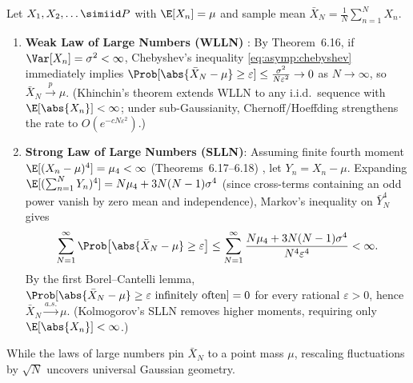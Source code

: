 \documentclass[../../../../master.tex]{subfiles}
\begin{document}
\begin{coremath}
Let $X_1, X_2, \dots \simiid P$ with $\E[X_n] = \mu$ and sample mean $\bar{X}_N = \frac{1}{N}\sum_{n=1}^N X_n$.
\begin{enumerate}
  \item \textbf{Weak Law of Large Numbers (WLLN)} : By Theorem~6.16, if $\Var[X_n] = \sigma^2 < \infty$, Chebyshev's inequality \eqref{eq:asymp:chebyshev} immediately implies $\Prob[\abs{\bar{X}_N - \mu} \ge \varepsilon] \le \frac{\sigma^2}{N\varepsilon^2} \to 0$ as $N \to \infty$, so $\bar{X}_N \xrightarrow{p} \mu$. (Khinchin's theorem extends WLLN to any i.i.d.\ sequence with $\E[\abs{X_n}] < \infty$; under sub-Gaussianity, Chernoff/Hoeffding strengthens the rate to $O(e^{-cN\varepsilon^2})$.)
  \item \textbf{Strong Law of Large Numbers (SLLN)}: Assuming finite fourth moment $\E[(X_n - \mu)^4] = \mu_4 < \infty$ (Theorems~6.17--6.18) , let $Y_n = X_n - \mu$. Expanding $\E[(\sum_{n=1}^N Y_n)^4] = N\mu_4 + 3N(N-1)\sigma^4$ (since cross-terms containing an odd power vanish by zero mean and independence), Markov's inequality on $\bar{Y}_N^4$ gives
  \begin{equation}
  \sum_{N=1}^\infty \Prob\bigl[\abs{\bar{X}_N - \mu} \ge \varepsilon\bigr] \le \sum_{N=1}^\infty \frac{N\mu_4 + 3N(N-1)\sigma^4}{N^4 \varepsilon^4} < \infty.
  \end{equation}
  By the first Borel--Cantelli lemma, $\Prob[\abs{\bar{X}_N - \mu} \ge \varepsilon \text{ infinitely often}] = 0$ for every rational $\varepsilon > 0$, hence $\bar{X}_N \xrightarrow{a.s.} \mu$. (Kolmogorov's SLLN removes higher moments, requiring only $\E[\abs{X_n}] < \infty$.)
\end{enumerate}
\end{coremath}

While the laws of large numbers pin $\bar{X}_N$ to a point mass $\mu$, rescaling fluctuations by $\sqrt{N}$ uncovers universal Gaussian geometry.
\end{document}
